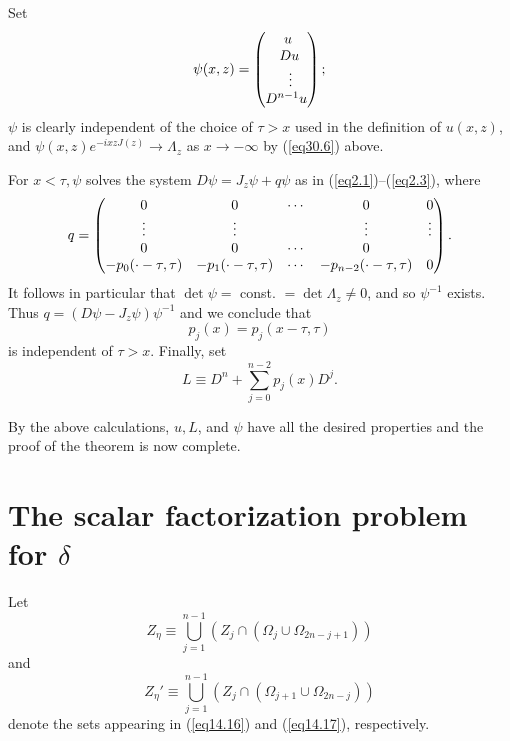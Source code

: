 \documentclass{surv-l}
\theoremstyle{plain}
\theoremstyle{definition}
\numberwithin{equation}{chapter}
\begin{document}
Set
\begin{equation*}
\psi (x, z)=\left(\begin{array}{@{}l@{}}
\ \ \ \ u\\
\ \ \ Du\\
{\ \ \ \ \   \vdots}\\
D^{n-1}u
\end{array}\right)\mathrm{;}
\end{equation*}
$\psi$ is clearly independent of the choice of $\tau>x$ used in the definition of $u(x, z)$, and $\psi(x, z)e^{-ixzJ(z)}\rightarrow\Lambda_{z}$ as $ x\rightarrow-\infty$ by (\ref{eq30.6}) above.

For $ x<\tau, \psi$ solves the system $ D\psi =J_{z}\psi+q\psi$ as in
(\ref{eq2.1})--(\ref{eq2.3}), where
\begin{equation*}
q=\left(\begin{array}{@{}ccccc@{}}
0      & 0      &\cdots  & 0         &  0        \\
\vdots & \vdots &        &\vdots     &\vdots     \\
0     & 0      &\cdots  & 0         &           \\
-p_{0}(\cdot-\tau,\tau) & -p_{1}(\cdot-\tau,\tau) &\cdots & -p_{n-2}(\cdot-\tau,\tau)& 0
\end{array}\right).
\end{equation*}
It follows in particular that $\det\psi=$ const. $=\det\Lambda_{z}\neq 0$, and so $\psi^{-1}$ exists. Thus $q=(D\psi-J_{z}\psi)\psi^{-1}$ and we conclude that
\begin{equation*}
p_{j}(x)=p_{j}(x-\tau, \tau)
\end{equation*}
is independent of $\tau>x$. Finally, set
\begin{equation*}
L\equiv D^{n}+\sum_{j=0}^{n-2}p_{j}(x)D^{j}.
\end{equation*}

By the above calculations, $u, L$, and $\psi$ have all the desired properties and the proof of the theorem is now complete. \quad

\section{The scalar factorization problem for $\delta$}\label{sec31} Let
\begin{equation}\label{eq31.1}
Z_{\eta}\equiv\bigcup_{j=1}^{n-1}(Z_{j}\cap(\Omega_{j}\cup\Omega_{2n-j+1}))
\end{equation}
and
\begin{equation}\label{eq31.2}
Z_{\eta}'\equiv\bigcup_{j=1}^{n-1}(Z_{j}\cap(\Omega_{j+1}\cup\Omega_{2n-j}))
\end{equation}
denote the sets appearing in (\ref{eq14.16}) and (\ref{eq14.17}), respectively.
\end{document}
